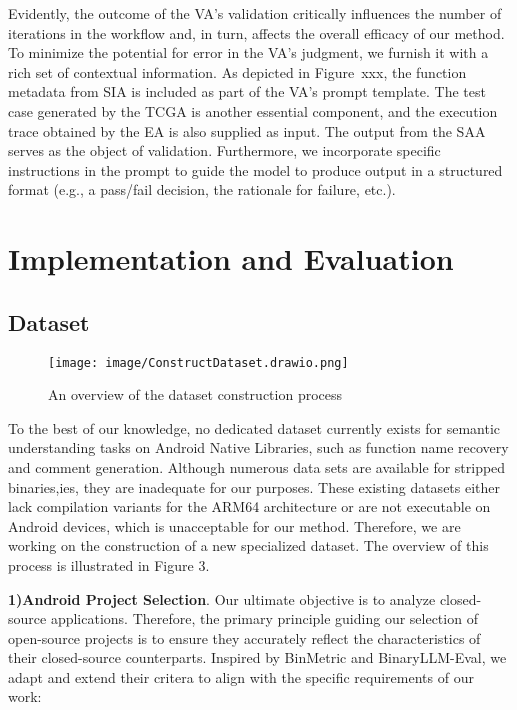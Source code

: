 \documentclass[acmsmall,screen,review,anonymous]{acmart} %
\begin{document}
Evidently, the outcome of the VA's validation critically influences the number of iterations in the workflow and, in turn, affects the overall efficacy of our method. To minimize the potential for error in the VA's judgment, we furnish it with a rich set of contextual information. As depicted in Figure~xxx, the function metadata from SIA is included as part of the VA's prompt template. The test case generated by the TCGA is another essential component, and the execution trace obtained by the EA is also supplied as input. The output from the SAA serves as the object of validation. Furthermore, we incorporate specific instructions in the prompt to guide the model to produce output in a structured format (e.g., a pass/fail decision, the rationale for failure, etc.).



\section{Implementation and Evaluation}

\subsection{Dataset}
\begin{figure}[h] %
    \centering
    \texttt{[image: image/ConstructDataset.drawio.png]} %
    \caption{An overview of the dataset construction process} %
    \label{fig:construct-dataset} %
\end{figure}

To the best of our knowledge, no dedicated dataset currently exists for semantic understanding tasks on Android Native Libraries, such as function name recovery and comment generation. Although numerous data sets are available for stripped binaries,ies, they are inadequate for our purposes. These existing datasets either lack compilation variants for the ARM64 architecture or are not executable on Android devices, which is unacceptable for our method. Therefore, we are working on the construction of a new specialized dataset. The overview of this process is illustrated in Figure 3.

\textbf{1)Android Project Selection}. Our ultimate objective is to analyze closed-source applications. Therefore, the primary principle guiding our selection of open-source projects is to ensure they accurately reflect the characteristics of their closed-source counterparts. Inspired by BinMetric and BinaryLLM-Eval, we adapt and extend their critera to align with the specific requirements of our work:
\end{document}

